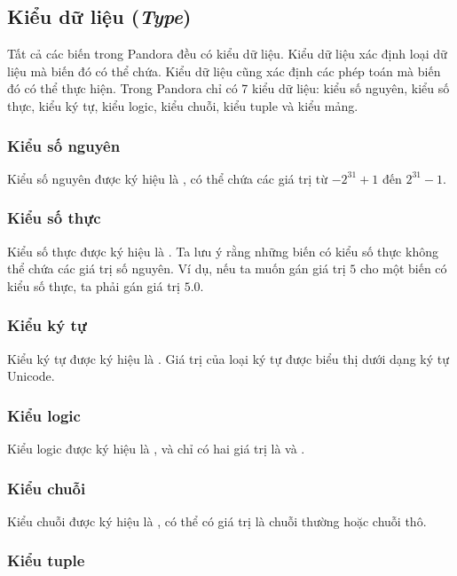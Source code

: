 \subsection{Kiểu dữ liệu (\textit{Type})}

    Tất cả các biến trong Pandora đều có kiểu dữ liệu. Kiểu dữ liệu xác định loại dữ liệu mà biến đó có thể chứa. Kiểu dữ liệu cũng xác định các phép toán mà biến đó có thể thực hiện. Trong Pandora chỉ có 7 kiểu dữ liệu: kiểu số nguyên, kiểu số thực, kiểu ký tự, kiểu logic, kiểu chuỗi, kiểu tuple và kiểu mảng.

\subsubsection{Kiểu số nguyên}

    Kiểu số nguyên được ký hiệu là , có thể chứa các giá trị từ $-2^{31}+1$ đến $2^{31}-1$.

\subsubsection{Kiểu số thực}

    Kiểu số thực được ký hiệu là . Ta lưu ý rằng những biến có kiểu số thực không thể chứa các giá trị số nguyên. Ví dụ, nếu ta muốn gán giá trị $5$ cho một biến có kiểu số thực, ta phải gán giá trị $5.0$.

\subsubsection{Kiểu ký tự}

    Kiểu ký tự được ký hiệu là . Giá trị của loại ký tự được biểu thị dưới dạng ký tự Unicode.

\subsubsection{Kiểu logic}

    Kiểu logic được ký hiệu là , và chỉ có hai giá trị là  và .

\subsubsection{Kiểu chuỗi}

    Kiểu chuỗi được ký hiệu là , có thể có giá trị là chuỗi thường hoặc chuỗi thô.

\subsubsection{Kiểu tuple}

